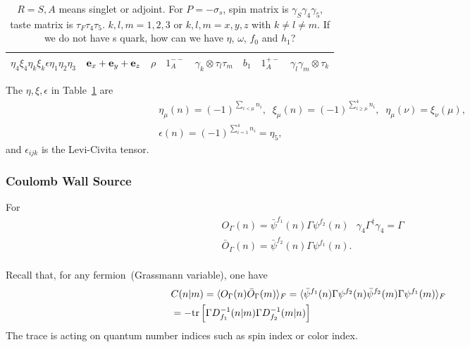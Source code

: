 \begin{table}
\begin{center}
\begin{tabular}{c|c|ccc|ccc}
$\eta_4\xi_4\eta_k\xi_k\epsilon\eta _1\eta _2\eta _3$ & ${\bf e}_x+{\bf e}_y+{\bf e}_z$ & $\rho$ & $1^{--}_A$ & $\gamma_k\otimes\tau_l\tau_m$        & $b_1$    & $1^{+-}_A$ & $\gamma _l\gamma _m\otimes \tau _k$ \\
\hline
\end{tabular}
\end{center}
\caption{\label{tab:staggeredMeson}$R=S,A$ means singlet or adjoint. For $P=-\sigma _s$, spin matrix is $\gamma _S\gamma _4\gamma _5$, taste matrix is $\tau _F\tau _4\tau _5$. $k,l,m=1,2,3$ or $k,l,m=x,y,z$ with $k\neq l\neq m$. \textcolor[rgb]{1,0,0}{If we do not have s quark, how can we have $\eta$, $\omega$, $f_0$ and $h_1$?}}
\end{table}

The $\eta,\xi,\epsilon$ in Table~\ref{tab:staggeredMeson} are
\begin{equation}
\begin{split}
&\eta_{\mu}(n)=(-1)^{\sum _{i<\mu} n_i},\;\;\xi _{\mu}(n)=(-1)^{\sum _{i\geq \mu}^4 n_i},\;\;\eta _{\mu}(\nu)=\xi _{\nu}(\mu),\\
&\epsilon (n) = (-1)^{\sum _{i=1}^4 n_i}=\eta _5, 
\end{split}
\end{equation}
and $\epsilon _{ijk}$ is the Levi-Civita tensor.

\subsubsection{\label{CoulombWallSource}Coulomb Wall Source}

For 
\begin{equation}
\begin{split}
&O_{\Gamma}(n)= \bar{\psi} ^{f_1} (n)\Gamma \psi ^{f_2} (n)\,\;\;\gamma _4 \Gamma ^{\dagger}\gamma _4=\Gamma \\
&\bar{O}_{\Gamma}(n)=\bar{\psi} ^{f_2} (n)\Gamma \psi ^{f_1} (n).\\
\end{split}
\end{equation}

Recall that, for any fermion~(Grassmann variable), one have
\begin{equation}
\begin{split}
&C(n|m)=\langle O_{\Gamma}(n)\bar{O}_{\Gamma}(m)\rangle _F=\langle \bar{\psi} ^{f_1} (n)\Gamma \psi ^{f_2} (n)\bar{\psi} ^{f_2} (m)\Gamma \psi ^{f_1}(m)\rangle _F\\
&=-{\rm tr} \left[\Gamma  D^{-1}_{f_1}(n|m)\Gamma  D^{-1}_{f_2}(m|n)\right]
\end{split}
\end{equation}
The trace is acting on quantum number indices such as spin index or color index. 

